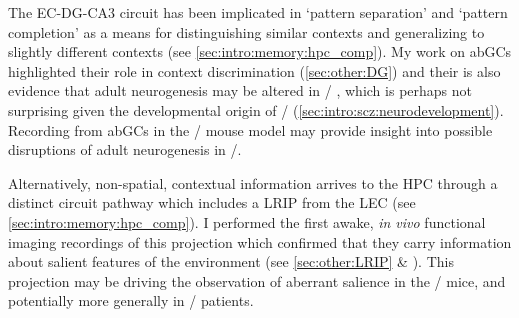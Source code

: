 The EC-DG-CA3 circuit has been implicated in `pattern separation' and `pattern completion'  as a means for distinguishing similar contexts and generalizing to slightly different contexts (see \autoref{sec:intro:memory:hpc_comp}).
My work on \ac{abGCs} highlighted their role in context discrimination (\autoref{sec:other:DG}) and their is also evidence that adult neurogenesis may be altered in \scz/ \citep[reviewed in,][]{Toro2007}, which is perhaps not surprising given the developmental origin of \scz/ (\autoref{sec:intro:scz:neurodevelopment}).
Recording from \ac{abGCs} in the \df/ mouse model may provide insight into possible disruptions of adult neurogenesis in \scz/.

Alternatively, non-spatial, contextual information arrives to the \ac{HPC} through a distinct circuit pathway which includes a \ac{LRIP} from the \ac{LEC} (see \autoref{sec:intro:memory:hpc_comp}).
I performed the first awake, \emph{in vivo} functional imaging recordings of this projection which confirmed that they carry information about salient features of the environment (see \autoref{sec:other:LRIP} \& \citet{Basu2016}).
This projection may be driving the observation of aberrant salience in the \df/ mice, and potentially more generally in \scz/ patients.

